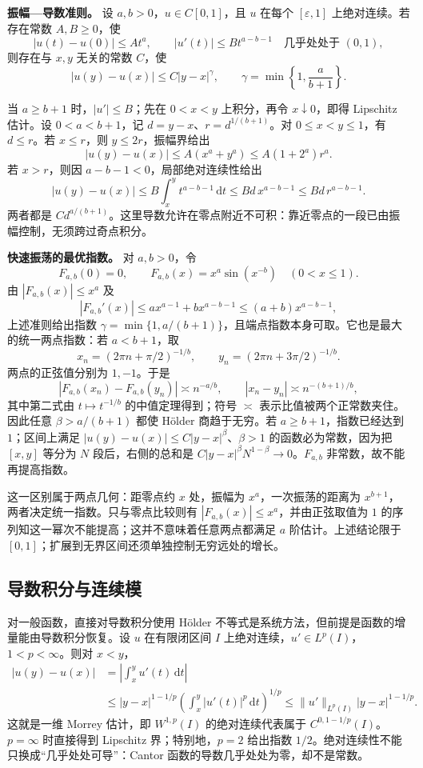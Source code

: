 \documentclass[UTF8,12pt,a4paper,fontset=fandol]{ctexart}
\begin{document}
\textbf{振幅---导数准则。} 设 $a,b>0$，$u\in C[0,1]$，且 $u$ 在每个 $[\varepsilon,1]$ 上绝对连续。若存在常数 $A,B\ge0$，使
\[
|u(t)-u(0)|\le At^a,\qquad
|u'(t)|\le Bt^{a-b-1}\quad\text{几乎处处于 }(0,1),
\]
则存在与 $x,y$ 无关的常数 $C$，使
\[
|u(y)-u(x)|\le C|y-x|^\gamma,
\qquad \gamma=\min\left\{1,\frac a{b+1}\right\}.
\]

当 $a\ge b+1$ 时，$|u'|\le B$；先在 $0<x<y$ 上积分，再令 $x\downarrow0$，即得 Lipschitz 估计。设 $0<a<b+1$，记 $d=y-x$、$r=d^{1/(b+1)}$。对 $0\le x<y\le1$，有 $d\le r$。若 $x\le r$，则 $y\le2r$，振幅界给出
\[
|u(y)-u(x)|\le A(x^a+y^a)
\le A(1+2^a)r^a.
\]
若 $x>r$，则因 $a-b-1<0$，局部绝对连续性给出
\[
|u(y)-u(x)|\le B\int_x^yt^{a-b-1}\,\mathrm dt
\le Bd\,x^{a-b-1}\le Bd\,r^{a-b-1}.
\]
两者都是 $C d^{a/(b+1)}$。这里导数允许在零点附近不可积：靠近零点的一段已由振幅控制，无须跨过奇点积分。

\textbf{快速振荡的最优指数。} 对 $a,b>0$，令
\[
F_{a,b}(0)=0,\qquad F_{a,b}(x)=x^a\sin(x^{-b})\quad(0<x\le1).
\]
由 $|F_{a,b}(x)|\le x^a$ 及
\[
|F_{a,b}'(x)|
\le a x^{a-1}+b x^{a-b-1}
\le(a+b)x^{a-b-1},
\]
上述准则给出指数 $\gamma=\min\{1,a/(b+1)\}$，且端点指数本身可取。它也是最大的统一两点指数：若 $a<b+1$，取
\[
x_n=(2\pi n+\pi/2)^{-1/b},\qquad
y_n=(2\pi n+3\pi/2)^{-1/b}.
\]
两点的正弦值分别为 $1,-1$。于是
\[
|F_{a,b}(x_n)-F_{a,b}(y_n)|\asymp n^{-a/b},
\qquad |x_n-y_n|\asymp n^{-(b+1)/b},
\]
其中第二式由 $t\mapsto t^{-1/b}$ 的中值定理得到；符号 $\asymp$ 表示比值被两个正常数夹住。因此任意 $\beta>a/(b+1)$ 都使 Hölder 商趋于无穷。若 $a\ge b+1$，指数已经达到 $1$；区间上满足 $|u(y)-u(x)|\le C|y-x|^\beta$、$\beta>1$ 的函数必为常数，因为把 $[x,y]$ 等分为 $N$ 段后，右侧的总和是 $C|y-x|^\beta N^{1-\beta}\to0$。$F_{a,b}$ 非常数，故不能再提高指数。

这一区别属于两点几何：距零点约 $x$ 处，振幅为 $x^a$，一次振荡的距离为 $x^{b+1}$，两者决定统一指数。只与零点比较则有 $|F_{a,b}(x)|\le x^a$，并由正弦取值为 $1$ 的序列知这一幂次不能提高；这并不意味着任意两点都满足 $a$ 阶估计。上述结论限于 $[0,1]$；扩展到无界区间还须单独控制无穷远处的增长。

\subsection{导数积分与连续模}

\label{app:estimate-derivative}

对一般函数，直接对导数积分使用 Hölder 不等式是系统方法，但前提是函数的增量能由导数积分恢复。设 $u$ 在有限闭区间 $I$ 上绝对连续，$u'\in L^p(I)$，$1<p<\infty$。则对 $x<y$，
\[
\begin{aligned}
|u(y)-u(x)|
&=\left|\int_x^yu'(t)\,\mathrm dt\right|\\
&\le |y-x|^{1-1/p}
\left(\int_x^y|u'(t)|^p\,\mathrm dt\right)^{1/p}
\le\|u'\|_{L^p(I)}|y-x|^{1-1/p}.
\end{aligned}
\]
这就是一维 Morrey 估计，即 $W^{1,p}(I)$ 的绝对连续代表属于 $C^{0,1-1/p}(I)$。$p=\infty$ 时直接得到 Lipschitz 界；特别地，$p=2$ 给出指数 $1/2$。绝对连续性不能只换成“几乎处处可导”：Cantor 函数的导数几乎处处为零，却不是常数。
\end{document}
